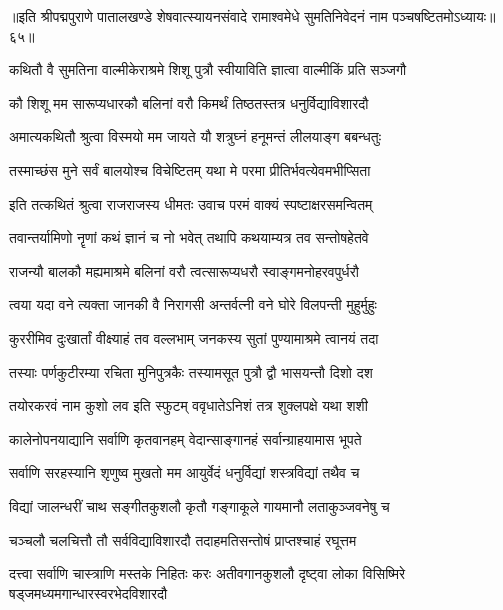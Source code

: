 {॥इति श्रीपद्मपुराणे पातालखण्डे शेषवात्स्यायनसंवादे रामाश्वमेधे सुमतिनिवेदनं नाम पञ्चषष्टितमोऽध्यायः॥६५॥}



\twolineshloka
{कथितौ वै सुमतिना वाल्मीकेराश्रमे शिशू}
{पुत्रौ स्वीयाविति ज्ञात्वा वाल्मीकिं प्रति सञ्जगौ}%


\twolineshloka
{कौ शिशू मम सारूप्यधारकौ बलिनां वरौ}
{किमर्थं तिष्ठतस्तत्र धनुर्विद्याविशारदौ}%

\twolineshloka
{अमात्यकथितौ श्रुत्वा विस्मयो मम जायते}
{यौ शत्रुघ्नं हनूमन्तं लीलयाङ्ग बबन्धतुः}%

\twolineshloka
{तस्माच्छंस मुने सर्वं बालयोश्च विचेष्टितम्}
{यथा मे परमा प्रीतिर्भवत्येवमभीप्सिता}%

\twolineshloka
{इति तत्कथितं श्रुत्वा राजराजस्य धीमतः}
{उवाच परमं वाक्यं स्पष्टाक्षरसमन्वितम्}%


\twolineshloka
{तवान्तर्यामिणो नॄणां कथं ज्ञानं च नो भवेत्}
{तथापि कथयाम्यत्र तव सन्तोषहेतवे}%

\twolineshloka
{राजन्यौ बालकौ मह्यमाश्रमे बलिनां वरौ}
{त्वत्सारूप्यधरौ स्वाङ्गमनोहरवपुर्धरौ}%

\twolineshloka
{त्वया यदा वने त्यक्ता जानकी वै निरागसी}
{अन्तर्वत्नी वने घोरे विलपन्ती मुहुर्मुहुः}%

\twolineshloka
{कुररीमिव दुःखार्तां वीक्ष्याहं तव वल्लभाम्}
{जनकस्य सुतां पुण्यामाश्रमे त्वानयं तदा}%

\twolineshloka
{तस्याः पर्णकुटीरम्या रचिता मुनिपुत्रकैः}
{तस्यामसूत पुत्रौ द्वौ भासयन्तौ दिशो दश}%

\twolineshloka
{तयोरकरवं नाम कुशो लव इति स्फुटम्}
{ववृधातेऽनिशं तत्र शुक्लपक्षे यथा शशी}%

\twolineshloka
{कालेनोपनयाद्यानि सर्वाणि कृतवानहम्}
{वेदान्साङ्गानहं सर्वान्ग्राहयामास भूपते}%

\twolineshloka
{सर्वाणि सरहस्यानि शृणुष्व मुखतो मम}
{आयुर्वेदं धनुर्विद्यां शस्त्रविद्यां तथैव च}%

\twolineshloka
{विद्यां जालन्धरीं चाथ सङ्गीतकुशलौ कृतौ}
{गङ्गाकूले गायमानौ लताकुञ्जवनेषु च}%

\twolineshloka
{चञ्चलौ चलचित्तौ तौ सर्वविद्याविशारदौ}
{तदाहमतिसन्तोषं प्राप्तश्चाहं रघूत्तम}%


\threelineshloka
{दत्त्वा सर्वाणि चास्त्राणि मस्तके निहितः करः}
{अतीवगानकुशलौ दृष्ट्वा लोका विसिष्मिरे}
{षड्जमध्यमगान्धारस्वरभेदविशारदौ}%

